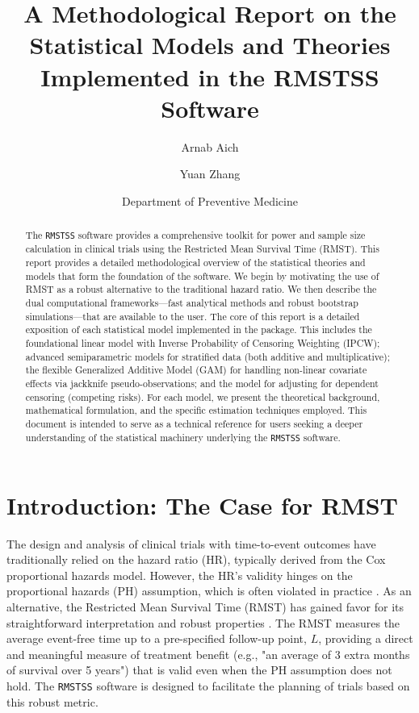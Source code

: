 \documentclass[11pt, a4paper]{article}
\begin{document}
\title{\textbf{A Methodological Report on the Statistical Models and Theories Implemented in the RMSTSS Software}}
\author{Arnab Aich \and Yuan Zhang}
\date{Department of Preventive Medicine}
\maketitle

\begin{abstract}
The \texttt{RMSTSS} software provides a comprehensive toolkit for power and sample size calculation in clinical trials using the Restricted Mean Survival Time (RMST). This report provides a detailed methodological overview of the statistical theories and models that form the foundation of the software. We begin by motivating the use of RMST as a robust alternative to the traditional hazard ratio. We then describe the dual computational frameworks—fast analytical methods and robust bootstrap simulations—that are available to the user. The core of this report is a detailed exposition of each statistical model implemented in the package. This includes the foundational linear model with Inverse Probability of Censoring Weighting (IPCW); advanced semiparametric models for stratified data (both additive and multiplicative); the flexible Generalized Additive Model (GAM) for handling non-linear covariate effects via jackknife pseudo-observations; and the model for adjusting for dependent censoring (competing risks). For each model, we present the theoretical background, mathematical formulation, and the specific estimation techniques employed. This document is intended to serve as a technical reference for users seeking a deeper understanding of the statistical machinery underlying the \texttt{RMSTSS} software.
\end{abstract}

\clearpage

\section{Introduction: The Case for RMST}

The design and analysis of clinical trials with time-to-event outcomes have traditionally relied on the hazard ratio (HR), typically derived from the Cox proportional hazards model. However, the HR's validity hinges on the proportional hazards (PH) assumption, which is often violated in practice \cite{uno2014}. As an alternative, the Restricted Mean Survival Time (RMST) has gained favor for its straightforward interpretation and robust properties \cite{royston2013}. The RMST measures the average event-free time up to a pre-specified follow-up point, $L$, providing a direct and meaningful measure of treatment benefit (e.g., "an average of 3 extra months of survival over 5 years") that is valid even when the PH assumption does not hold. The \texttt{RMSTSS} software is designed to facilitate the planning of trials based on this robust metric.
\end{document}
